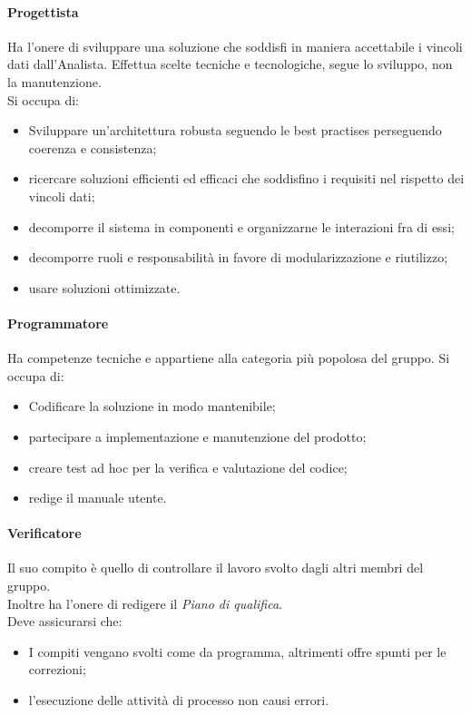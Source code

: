         \paragraph{Progettista}
            Ha l'onere di sviluppare una soluzione che soddisfi in maniera accettabile i vincoli dati dall'Analista.
            Effettua scelte tecniche e tecnologiche, segue lo sviluppo, non la manutenzione. \\
            Si occupa di:
            \begin{itemize}
                \item Sviluppare un'architettura robusta seguendo le best practises perseguendo coerenza e consistenza;
                \item ricercare soluzioni efficienti ed efficaci che soddisfino i requisiti nel rispetto dei vincoli dati;
                \item decomporre il sistema in componenti e organizzarne le interazioni fra di essi;
                \item decomporre ruoli e responsabilità in favore di modularizzazione e riutilizzo;
                \item usare soluzioni ottimizzate.
            \end{itemize}
        \paragraph{Programmatore}
            Ha competenze tecniche e appartiene alla categoria pi\`u popolosa del gruppo.
            Si occupa di:
            \begin{itemize}
                \item Codificare la soluzione in modo mantenibile;
                \item partecipare a implementazione e manutenzione del prodotto;
                \item creare test ad hoc per la verifica e valutazione del codice;
                \item redige il manuale utente.
            \end{itemize}
        \paragraph{Verificatore}
            Il suo compito \`e quello di controllare il lavoro svolto dagli altri membri del gruppo. \\
            Inoltre ha l'onere di redigere il \emph{Piano di qualifica}. \\
            Deve assicurarsi che:
            \begin{itemize}
                \item I compiti vengano svolti come da programma, altrimenti offre spunti per le correzioni;
                \item l'esecuzione delle attivit\`a di processo non causi errori.
            \end{itemize}
